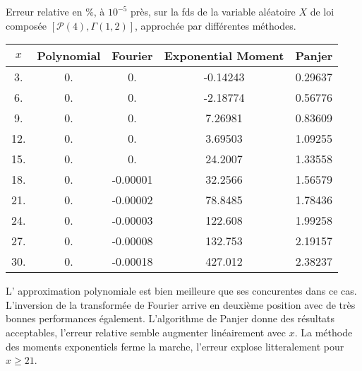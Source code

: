 \begin{tableth}
		\caption[Erreur relative ($\%$) sur la \gls{fds} d'une loi $\left(\mathcal{P}(4),\Gamma(1,2)\right)$]{Erreur relative en $\%$, à $10^{-5}$ près, sur la \gls{fds} de la variable aléatoire $X$ de loi composée $\left[\mathcal{P}(4),\Gamma(1,2)\right]$, approchée par différentes méthodes.}
			\label{TableRelativeErrorSurvivalDifferentMethodCompoundPoissonExponential}
		\begin{tabular}{|c||c|c|c|c|}
\hline
$x$ & Polynomial & Fourier & Exponential Moment &Panjer \\
\hline
\hline
3. & 0. & 0. & -0.14243 & 0.29637 \\
 6. & 0. & 0. & -2.18774 & 0.56776 \\
 9. & 0. & 0. & 7.26981 & 0.83609 \\
 12. & 0. & 0. & 3.69503 & 1.09255 \\
 15. & 0. & 0. & 24.2007 & 1.33558 \\
 18. & 0. & -0.00001 & 32.2566 & 1.56579 \\
 21. & 0. & -0.00002 & 78.8485 & 1.78436 \\
 24. & 0. & -0.00003 & 122.608 & 1.99258 \\
 27. & 0. & -0.00008 & 132.753 & 2.19157 \\
 30. & 0. & -0.00018 & 427.012 & 2.38237 \\
\hline
		\end{tabular}
	\end{tableth}

L\rq{} approximation polynomiale est bien meilleure que ses concurentes dans ce cas. L\rq{}inversion de la transformée de Fourier arrive en deuxième position avec de très bonnes performances également. L\rq{}algorithme de Panjer donne des résultats acceptables, l'erreur relative semble augmenter linéairement avec $x$. La méthode des moments exponentiels ferme la marche, l\rq{}erreur explose litteralement pour $x\geq21$.\\ 

